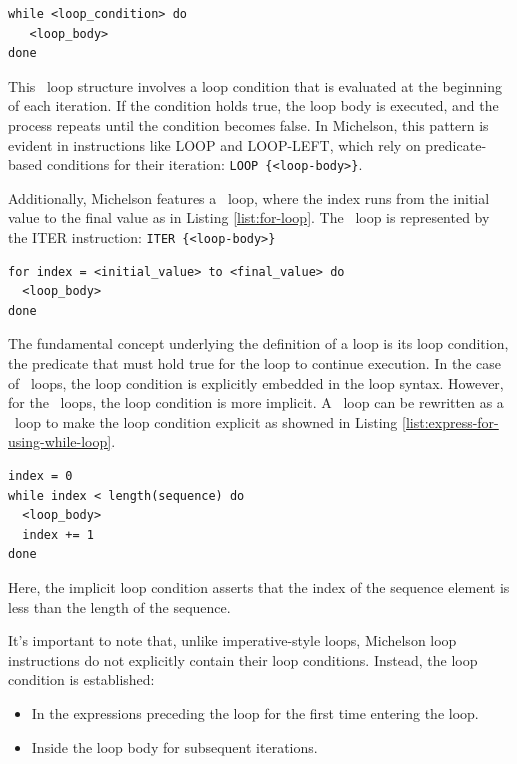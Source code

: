\documentclass[a4paper,UKenglish,cleveref, autoref, thm-restate]{lipics-v2021}
\begin{document}
\begin{lstlisting}[caption={While loop.},label=list:while-loop,captionpos=t,float,abovecaptionskip=-\medskipamount]
while <loop_condition> do
   <loop_body>
done
\end{lstlisting}
This \KWHILE\  loop structure involves a loop condition that is evaluated at the beginning of each iteration. If the condition holds true, the loop body is executed, and the process repeats until the condition becomes false.  In Michelson, this pattern is evident in instructions like LOOP and LOOP-LEFT, which rely on predicate-based conditions for their iteration: \lstinline/LOOP {<loop-body>}/.

Additionally, Michelson features a \KFOR\ loop, where the index runs from the initial value to the final value as in Listing \ref{list:for-loop}. The \KFOR\ loop is represented by the ITER instruction: \lstinline/ITER {<loop-body>}/

\begin{lstlisting}[caption={For loop.},label=list:for-loop,captionpos=t,float,abovecaptionskip=-\medskipamount]
for index = <initial_value> to <final_value> do
  <loop_body>
done
\end{lstlisting}

The fundamental concept underlying the definition of a loop is its loop condition, the predicate that must hold true for the loop to continue execution. In the case of \KWHILE\ loops, the  loop condition is explicitly embedded in the loop syntax. However, for the \KFOR\  loops, the loop condition is more implicit. A \KFOR\  loop can be rewritten as a  \KWHILE\ loop to make the  loop condition explicit as showned in Listing \ref{list:express-for-using-while-loop}.
\begin{lstlisting}[caption={Expressing a \KFOR\ loop using a \KWHILE\ loop.},label=list:express-for-using-while-loop,captionpos=t,float,abovecaptionskip=-\medskipamount]
index = 0
while index < length(sequence) do
  <loop_body>
  index += 1
done
\end{lstlisting}
Here, the implicit loop condition asserts that the index of the sequence element is less than the length of the sequence.

It's important  to note that, unlike imperative-style loops, Michelson loop instructions do not explicitly contain their loop conditions. Instead, the  loop condition is established:
\begin{itemize}
 \item In the expressions preceding the loop for the first time entering the loop.
 \item Inside the loop body for subsequent iterations.
\end{itemize}
\end{document}
